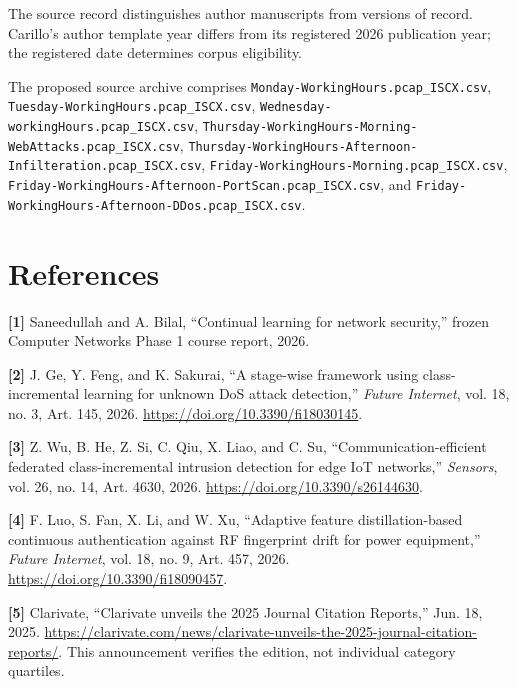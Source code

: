 \documentclass[10pt,a4paper]{article}
\begin{document}
The source record distinguishes author manuscripts from versions of record. Carillo's author template year differs from its registered 2026 publication year; the registered date determines corpus eligibility.

The proposed source archive comprises \texttt{Monday-WorkingHours.pcap_ISCX.csv}, \texttt{Tuesday-WorkingHours.pcap_ISCX.csv}, \texttt{Wednesday-workingHours.pcap_ISCX.csv}, \texttt{Thursday-WorkingHours-Morning-WebAttacks.pcap_ISCX.csv}, \texttt{Thursday-WorkingHours-Afternoon-Infilteration.pcap_ISCX.csv}, \texttt{Friday-WorkingHours-Morning.pcap_ISCX.csv}, \texttt{Friday-WorkingHours-Afternoon-PortScan.pcap_ISCX.csv}, and \texttt{Friday-WorkingHours-Afternoon-DDos.pcap_ISCX.csv}.



\section*{References}


\par\noindent\textbf{[1]}  Saneedullah and A. Bilal, ``Continual learning for network security,'' frozen Computer Networks Phase 1 course report, 2026.

\par\noindent\textbf{[2]}  J. Ge, Y. Feng, and K. Sakurai, ``A stage-wise framework using class-incremental learning for unknown DoS attack detection,'' \emph{Future Internet}, vol. 18, no. 3, Art. 145, 2026. \url{https://doi.org/10.3390/fi18030145}.

\par\noindent\textbf{[3]}  Z. Wu, B. He, Z. Si, C. Qiu, X. Liao, and C. Su, ``Communication-efficient federated class-incremental intrusion detection for edge IoT networks,'' \emph{Sensors}, vol. 26, no. 14, Art. 4630, 2026. \url{https://doi.org/10.3390/s26144630}.

\par\noindent\textbf{[4]}  F. Luo, S. Fan, X. Li, and W. Xu, ``Adaptive feature distillation-based continuous authentication against RF fingerprint drift for power equipment,'' \emph{Future Internet}, vol. 18, no. 9, Art. 457, 2026. \url{https://doi.org/10.3390/fi18090457}.

\par\noindent\textbf{[5]}  Clarivate, ``Clarivate unveils the 2025 Journal Citation Reports,'' Jun. 18, 2025. \url{https://clarivate.com/news/clarivate-unveils-the-2025-journal-citation-reports/}. This announcement verifies the edition, not individual category quartiles.
\end{document}
